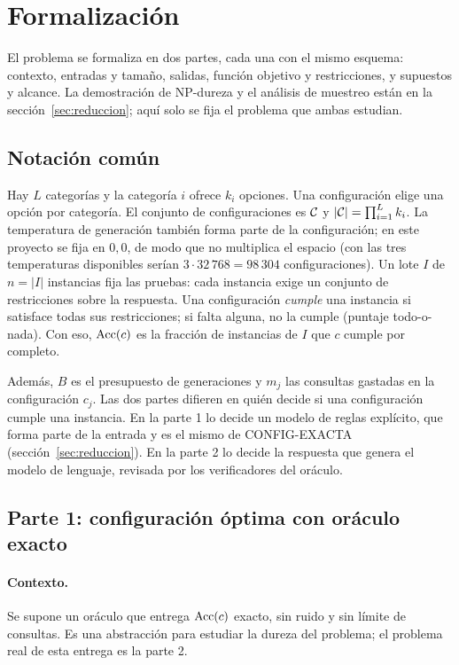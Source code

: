 \section{Formalización}
\label{sec:formalizacion}

El problema se formaliza en dos partes, cada una con el mismo esquema: contexto, entradas
y tamaño, salidas, función objetivo y restricciones, y supuestos y alcance. La
demostración de NP-dureza y el análisis de muestreo están en la
sección~\ref{sec:reduccion}; aquí solo se fija el problema que ambas estudian.

\subsection{Notación común}

\begin{definicion}
Hay $L$ categorías y la categoría $i$ ofrece $k_i$ opciones. Una configuración elige una
opción por categoría. El conjunto de configuraciones es $\mathcal{C}$ y
$|\mathcal{C}|=\prod_{i=1}^{L}k_i$. La temperatura de generación también forma parte de la
configuración; en este proyecto se fija en $0{,}0$, de modo que no multiplica el espacio
(con las tres temperaturas disponibles serían $3\cdot 32\,768=98\,304$ configuraciones).
Un lote $I$ de $n=|I|$ instancias fija las pruebas: cada instancia exige un conjunto de
restricciones sobre la respuesta. Una configuración \emph{cumple} una instancia si
satisface todas sus restricciones; si falta alguna, no la cumple (puntaje todo-o-nada).
Con eso, $\operatorname{Acc}(c)$ es la fracción de instancias de $I$ que $c$ cumple por completo.
\end{definicion}

Además, $B$ es el presupuesto de generaciones y $m_j$ las consultas gastadas en la
configuración $c_j$. Las dos partes difieren en quién decide si una configuración cumple
una instancia. En la parte 1 lo decide un modelo de reglas explícito, que forma parte de
la entrada y es el mismo de CONFIG-EXACTA (sección~\ref{sec:reduccion}). En la parte 2 lo
decide la respuesta que genera el modelo de lenguaje, revisada por los verificadores del
oráculo.

\subsection{Parte 1: configuración óptima con oráculo exacto}

\paragraph{Contexto.} Se supone un oráculo que entrega $\operatorname{Acc}(c)$ exacto, sin ruido y sin
límite de consultas. Es una abstracción para estudiar la dureza del problema; el problema
real de esta entrega es la parte 2.

